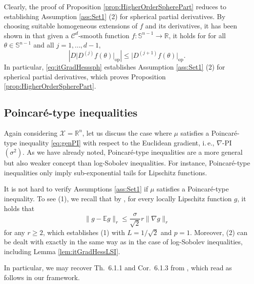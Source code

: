 \documentclass[a4paper,12pt]{amsart}
\numberwithin{equation}{section}
\theoremstyle{remark}
\def\E{{\mathbb E}}
\def\R{{\mathbb R}}
\def\S{{\mathbb S}}
\begin{document}
Clearly, the proof of Proposition \ref{prop:HigherOrderSpherePart} reduces to establishing Assumption \ref{ass:Set1} (2) for spherical partial derivatives. By choosing suitable homogeneous extensions of $f$ and its derivatives, it has been shown in \cite[Le.\ 5.1]{BGS19} that given a $\mathcal{C}^d$-smooth function $f \colon \S^{n-1} \to \mathbb{R}$, it holds for for all $\theta \in \S^{n-1}$ and all $j=1, \ldots, d-1$,
	\begin{equation}
	\label{eq:itGradHesssph}
	|D\lvert D^{(j)}f(\theta) \rvert_\mathrm{op}| \le \lvert D^{(j+1)}f(\theta) \rvert_\mathrm{op}.
	\end{equation}
In particular, \ref{eq:itGradHesssph} establishes Assumption \ref{ass:Set1} (2) for spherical partial derivatives, which proves Proposition \ref{prop:HigherOrderSpherePart}.

\subsection{Poincar\'{e}-type inequalities}

Again considering $\mathcal{X} = \R^n$, let us discuss the case where $\mu$ satisfies a Poincar\'e-type inequality \eqref{eq:genPI} with respect to the Euclidean gradient, i.\,e., $\nabla$-PI$(\sigma^2)$. As we have already noted, Poincar\'e-type inequalities are a more general but also weaker concept than log-Sobolev inequalities. For instance, Poincar\'{e}-type inequalities only imply sub-exponential tails for Lipschitz functions.

It is not hard to verify Assumptions \ref{ass:Set1} if $\mu$ satisfies a Poincar\'{e}-type inequality. To see (1), we recall that by \cite[Prop.\ 6.2.1]{BCG23}, for every locally Lipschitz function $g$, it holds that
\begin{equation}
\lVert g - \E g \rVert_r \le \frac{\sigma}{\sqrt{2}} r \lVert \nabla g \rVert_r
\end{equation}
for any $r \ge 2$, which establishes (1) with $L=1/\sqrt{2}$ and $p=1$. Moreover, (2) can be dealt with exactly in the same way as in the case of log-Sobolev inequalities, including Lemma \ref{lem:itGradHessLSI}.

In particular, we may recover Th.\ 6.1.1 and Cor.\ 6.1.3 from \cite{GS19}, which read as follows in our framework.
\end{document}
